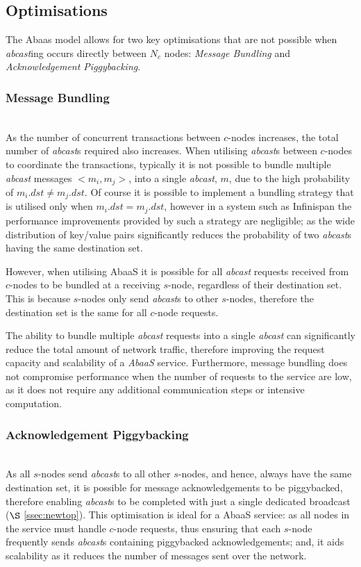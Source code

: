 	\subsection{Optimisations}\label{ssec:abaas_optimisations}
	The \textsf{Abaas} model allows for two key optimisations that are not possible when \emph{abcast}ing occurs directly between $N_c$ nodes: \emph{Message Bundling} and \emph{Acknowledgement Piggybacking}.  
	
		\subsubsection{Message Bundling} \hspace{0pt} \\
		As the number of concurrent transactions between $c$-nodes increases, the total number of \emph{abcast}s required also increases.  When utilising \emph{abcast}s between $c$-nodes to coordinate the transactions, typically it is not possible to bundle multiple \emph{abcast} messages $<m_i, m_j>$, into a single \emph{abcast}, $m$, due to the high probability of $m_i.dst \neq m_j.dst$.  Of course it is possible to implement a bundling strategy that is utilised only when $m_i.dst = m_j.dst$, however in a system such as Infinispan the performance improvements provided by such a strategy are negligible; as the wide distribution of key/value pairs significantly reduces the probability of two \emph{abcast}s having the same destination set.  
		
		However, when utilising \textsf{AbaaS} it is possible for all \emph{abcast} requests received from $c$-nodes to be bundled at a receiving $s$-node, regardless of their destination set.  This is because $s$-nodes only send \emph{abcast}s to other $s$-nodes, therefore the destination set is the same for all $c$-node requests.  
		
		The ability to bundle multiple \emph{abcast} requests into a single \emph{abcast} can significantly reduce the total amount of network traffic, therefore improving the request capacity and scalability of a \emph{AbaaS} service.  Furthermore, message bundling does not compromise performance when the number of requests to the service are low, as it does not require any additional communication steps or intensive computation.  
		
		\subsubsection{Acknowledgement Piggybacking} \hspace{0pt} \\
		As all $s$-nodes send \emph{abcast}s to all other $s$-nodes, and hence, always have the same destination set, it is possible for message acknowledgements to be piggybacked, therefore enabling \emph{abcast}s to be completed with just a single dedicated broadcast ($\S$ \ref{ssec:newtop}).  This optimisation is ideal for a \textsf{AbaaS} service: as all nodes in the service must handle $c$-node requests, thus ensuring that each $s$-node frequently sends \emph{abcast}s containing piggybacked acknowledgements; and, it aids scalability as it reduces the number of messages sent over the network. 
		
